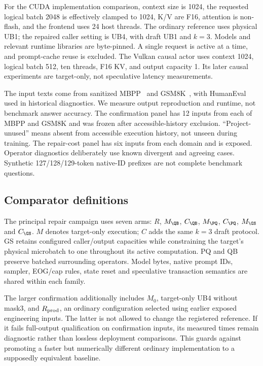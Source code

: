 For the CUDA implementation comparison, context size is 1024, the requested logical batch 2048 is effectively clamped to 1024, K/V are F16, attention is non-flash, and the frontend uses 24 host threads. The ordinary reference uses physical UB1; the repaired caller setting is UB4, with draft UB1 and $k=3$. Models and relevant runtime libraries are byte-pinned. A single request is active at a time, and prompt-cache reuse is excluded. The Vulkan causal actor uses context 1024, logical batch 512, ten threads, F16 KV, and output capacity 1. Its later causal experiments are target-only, not speculative latency measurements.

The input texts come from sanitized MBPP~\cite{mbpp} and GSM8K~\cite{gsm8k}, with HumanEval~\cite{humaneval} used in historical diagnostics. We measure output reproduction and runtime, not benchmark answer accuracy. The confirmation panel has 12 inputs from each of MBPP and GSM8K and was frozen after accessible-history exclusion. ``Project-unused'' means absent from accessible execution history, not unseen during training. The repair-cost panel has six inputs from each domain and is exposed. Operator diagnostics deliberately use known divergent and agreeing cases. Synthetic 127/128/129-token native-ID prefixes are not complete benchmark questions.

\subsection{Comparator definitions}
The principal repair campaign uses seven arms: $R$, $M_{\QB}$, $C_{\QB}$, $M_{\PQ}$, $C_{\PQ}$, $M_{\GS}$ and $C_{\GS}$. $M$ denotes target-only execution; $C$ adds the same $k=3$ draft protocol. GS retains configured caller/output capacities while constraining the target's physical microbatch to one throughout its active computation. PQ and QB preserve batched surrounding operators. Model bytes, native prompt IDs, sampler, EOG/cap rules, state reset and speculative transaction semantics are shared within each family.

The larger confirmation additionally includes $M_0$, target-only UB4 without mask3, and $R_{\rm prod}$, an ordinary configuration selected using earlier exposed engineering inputs. The latter is not allowed to change the registered reference. If it fails full-output qualification on confirmation inputs, its measured times remain diagnostic rather than lossless deployment comparisons. This guards against promoting a faster but numerically different ordinary implementation to a supposedly equivalent baseline.

